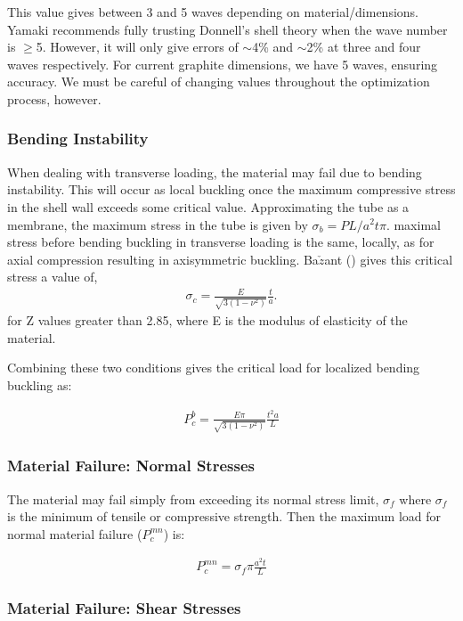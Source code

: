 \documentclass{report}
\begin{document}
This value gives between 3 and 5 waves depending on material/dimensions. Yamaki recommends fully trusting Donnell's shell theory when the wave number is $\geq$5. However, it will only give errors of $\sim$4\% and $\sim$2\% at three and four waves respectively. For current graphite dimensions, we have 5 waves, ensuring accuracy. We must be careful of changing values throughout the optimization process, however.


\subsubsection{Bending Instability}

When dealing with transverse loading, the material may fail due to bending instability. This will occur as local buckling once the maximum compressive stress in the shell wall exceeds some critical value. Approximating the tube as a membrane, the maximum stress in the tube is given by $\sigma_{b} = PL/a^2t\pi$. maximal stress before bending buckling in transverse loading is the same, locally, as for axial compression resulting in axisymmetric buckling. Ba$\check{z}$ant (\cite{Bazant1991}) gives this critical stress a value of,
\begin{eqnarray}
\sigma_{c}=\frac{E}{\sqrt{3(1-\nu^2)}}\frac{t}{a}.
\end{eqnarray}
for Z values greater than 2.85, where E is the modulus of elasticity of the material.

Combining these two conditions gives the critical load for localized bending buckling as:

\begin{eqnarray}
P_{c}^{b} = \frac{E \pi}{\sqrt{3(1-\nu^2)}}\frac{t^2a}{L}
\end{eqnarray}

\subsubsection{Material Failure: Normal Stresses}

The material may fail simply from exceeding its normal stress limit, $\sigma_{f}$ where $\sigma_{f}$ is the minimum of tensile or compressive strength. Then the maximum load for normal material failure ($P_{c}^{mn}$) is:

\begin{eqnarray}
P_{c}^{mn} = \sigma_{f} \pi \frac{a^2t}{L}
\end{eqnarray}


\subsubsection{Material Failure: Shear Stresses}
\end{document}
